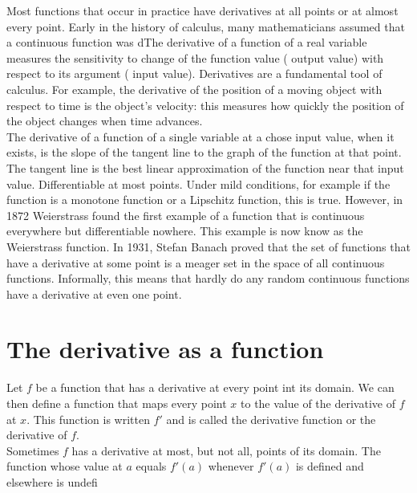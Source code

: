 Most functions that occur in practice have derivatives at all points or at almost every point. Early in the history of calculus, many mathematicians assumed that a continuous function was dThe derivative of a function of a real variable measures the sensitivity to change of the function value ( output
value) with respect to its argument ( input value). Derivatives are a fundamental tool of calculus. For example, the
derivative of the position of a moving object with respect to time is the object's velocity: this measures how
quickly the position of the object changes when time advances.\\
The derivative of a function of a single variable at a chose input value, when it exists, is the slope of the tangent
line to the graph of the function at that point. The tangent line is the best linear approximation of the function
near that input value. Differentiable at most points. Under mild conditions, for example if the function is a monotone function or a Lipschitz function, this is true. However, in 1872 Weierstrass found the first example of a function that is continuous everywhere but differentiable nowhere. This example is now know as the Weierstrass function. In 1931, Stefan Banach proved that the set of functions that have a derivative at some point is a meager set in the space of all continuous functions. Informally, this means that hardly do any random continuous functions have a derivative at even one point.
\section{The derivative as a function}
Let $f$ be a function that has a derivative at every point int its domain. We can then define a function that maps every point $x$ to the value of the derivative of $f$ at $x$. This function is written $f'$ and is called the derivative function or the derivative of $f$.\\

Sometimes $f$ has a derivative at most, but not all, points of its domain.
The function whose value at $a$ equals $f'(a)$ whenever $f'(a)$ is defined and elsewhere is undefi










